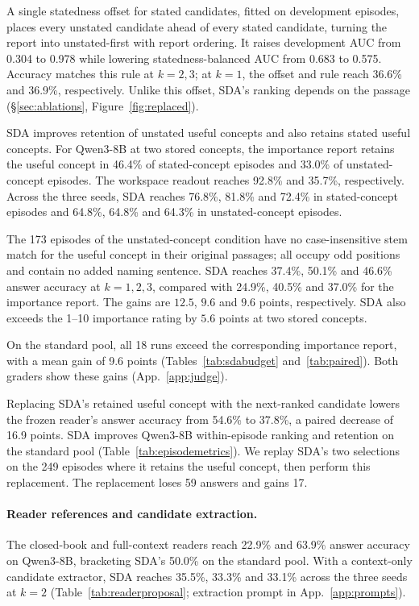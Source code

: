 A single statedness offset for stated candidates, fitted on development
episodes, places every unstated candidate ahead of every stated
candidate, turning the report into unstated-first with report ordering.
It raises development AUC from 0.304 to 0.978 while lowering
statedness-balanced AUC from 0.683 to 0.575. Accuracy matches this
rule at $k=2,3$; at $k=1$, the offset and rule reach 36.6\% and 36.9\%,
respectively. Unlike this offset, SDA's ranking depends on the passage
(\S\ref{sec:ablations}, Figure~\ref{fig:replaced}).

SDA improves retention of unstated useful concepts and also retains
stated useful concepts. For Qwen3-8B at two stored concepts, the
importance report retains the useful concept in 46.4\% of
stated-concept episodes and 33.0\% of unstated-concept episodes.
The workspace readout reaches 92.8\% and 35.7\%, respectively.
Across the three seeds, SDA reaches 76.8\%, 81.8\% and 72.4\% in
stated-concept episodes and 64.8\%, 64.8\% and 64.3\% in
unstated-concept episodes.

The 173 episodes of the unstated-concept condition have no
case-insensitive stem match for the useful concept in their original
passages; all occupy odd positions and contain no added naming
sentence. SDA reaches 37.4\%, 50.1\% and 46.6\% answer accuracy at
$k=1,2,3$, compared with 24.9\%, 40.5\% and 37.0\% for
the importance report. The gains are $12.5$, $9.6$ and $9.6$ points,
respectively. SDA also exceeds the 1--10 importance rating by $5.6$
points at two stored concepts.

On the standard pool, all 18 runs exceed the corresponding importance
report, with a mean gain of 9.6 points
(Tables~\ref{tab:sdabudget} and~\ref{tab:paired}). Both graders show
these gains (App.~\ref{app:judge}).

Replacing SDA's retained useful concept with the next-ranked
candidate lowers the frozen reader's answer accuracy from 54.6\%
to 37.8\%, a paired decrease of 16.9 points. SDA improves Qwen3-8B
within-episode ranking and retention on the standard pool
(Table~\ref{tab:episodemetrics}). We replay SDA's two selections on
the 249 episodes where it retains the useful concept, then perform
this replacement. The replacement loses 59 answers and gains 17.

\paragraph{Reader references and candidate extraction.}
The closed-book and full-context readers reach 22.9\% and 63.9\%
answer accuracy on Qwen3-8B, bracketing SDA's 50.0\% on the standard
pool. With a context-only candidate extractor, SDA reaches 35.5\%,
33.3\% and 33.1\% across the three seeds at $k=2$
(Table~\ref{tab:readerproposal}; extraction prompt in
App.~\ref{app:prompts}).

